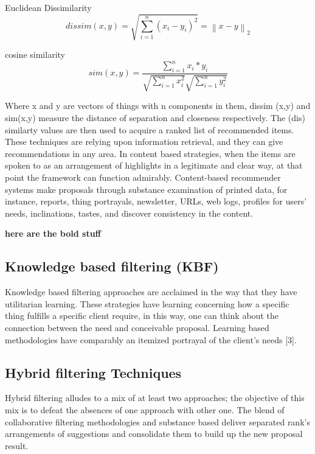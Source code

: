 \documentclass[10pt,conference]{IEEEtran}
\begin{document}
Euclidean Dissimilarity
\begin{equation}
dissim(x, y) = \sqrt{\sum_{i=1}^{n}\left ( x_{i} - y_{i} \right )^{2}} = \left \| x - y \right \|_2
\label{dissimilarity} \tag{3}
\end{equation}


cosine similarity
\begin{equation}
sim(x,y) = \frac{\sum_{i=1}^{n} x_{i} \ast y_{i}}{\sqrt{\sum_{i=1}^{n} x_{i}^{2}} \sqrt{\sum_{i=1}^{n} y_{i}^{2}}}
\label{eq:similarity} \tag{4}
\end{equation}

Where x and y are vectors of things with n components in them, dissim (x,y) and sim(x,y) measure the distance of separation and closeness respectively. The (dis) similarty values are then used to acquire a ranked list of recommended items. These techniques are relying upon information retrieval, and they can give recommendations in any area. In content based strategies, when the items are spoken to as an arrangement of highlights in a legitimate and clear way, at that point the framework can function admirably. Content-based recommender systems make proposals through substance examination of printed data, for instance, reports, thing portrayals, newsletter, URLs, web logs, profiles for users' needs, inclinations, tastes, and discover consistency in the content.

\textbf{here are the bold stuff}

\subsection{Knowledge based filtering (KBF)}
Knowledge based filtering approaches are acclaimed in the way that they have utilitarian learning. These strategies have learning concerning how a specific thing fulfills a specific client require, in this way, one can think about the connection between the need and conceivable proposal. Learning based methodologies have comparably an itemized portrayal of the client's needs [3].


\subsection{Hybrid filtering Techniques}
Hybrid filtering alludes to a mix of at least two approaches; the objective of this mix is to defeat the absences of one approach with other one. The blend of collaborative filtering methodologies and substance based deliver separated rank's arrangements of suggestions and consolidate them to build up the new proposal result.
\end{document}
